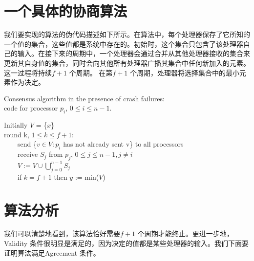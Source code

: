     \section{一个具体的协商算法}
    我们要实现的算法的伪代码描述如下所示。在算法中，每个处理器保存了它所知的一个值的集合，这些值都是系统中存在的。初始时，这个集合只包含了该处理器自己的输入。在接下来的周期中，一个处理器会通过合并从其他处理器接收的集合来更新其自身值的集合，同时会向其他所有处理器广播其集合中任何新加入的元素。这一过程将持续$f+1$ 个周期。 在第$f+1$ 个周期，处理器将选择集合中的最小元素作为决定。
    \begin{algorithm}[ht]
    \caption{Consensus algorithm in the presence of crash failures: \protect \\code for processor $p_i$, $0 \leq i \leq n-1$.}
    Initially $V$ = \{$x$\} \\
    \BlankLine
    round k, $1 \leq k \leq f+1:$\\
    ~~~~send \{$v \in V: p_i$ has not already sent v\} to all processors\\
    ~~~~receive $S_j$ from $p_j$, $0 \leq j \leq n-1, j \neq i$\\
    ~~~~$V := V \cup \bigcup_{j=0}^{n-1}{S_j}$\\
    ~~~~if $k = f+1$ then $y$ := min($V$) \\
    \end{algorithm}

    \section{算法分析}
    我们可以清楚地看到，该算法恰好需要$f+1$ 个周期才能终止。更进一步地，Validity 条件很明显是满足的，因为决定的值都是某些处理器的输入。我们下面要证明算法满足Agreement 条件。


